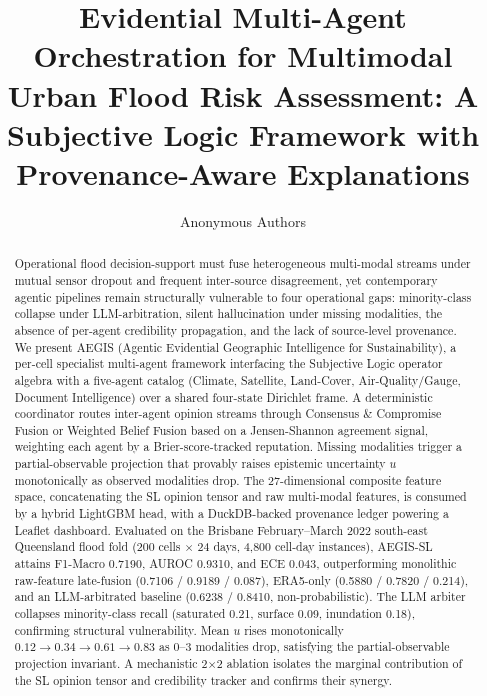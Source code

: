 \documentclass[a4paper,fleqn]{cas-dc}
\begin{document}
\let\WriteBookmarks\relax
\def\floatpagepagefraction{1}
\def\textpagefraction{0.001}


\title[mode=title]{Evidential Multi-Agent Orchestration for Multimodal Urban Flood Risk Assessment: A Subjective Logic Framework with Provenance-Aware Explanations}


\author[1]{Anonymous Authors}

\address[1]{Department of Computer Science / Engineering, Anonymous University}

\begin{abstract}
Operational flood decision-support must fuse heterogeneous multi-modal streams under mutual sensor dropout and frequent inter-source disagreement, yet contemporary agentic pipelines remain structurally vulnerable to four operational gaps: minority-class collapse under LLM-arbitration, silent hallucination under missing modalities, the absence of per-agent credibility propagation, and the lack of source-level provenance. We present AEGIS (Agentic Evidential Geographic Intelligence for Sustainability), a per-cell specialist multi-agent framework interfacing the Subjective Logic operator algebra with a five-agent catalog (Climate, Satellite, Land-Cover, Air-Quality/Gauge, Document Intelligence) over a shared four-state Dirichlet frame. A deterministic coordinator routes inter-agent opinion streams through Consensus \& Compromise Fusion or Weighted Belief Fusion based on a Jensen-Shannon agreement signal, weighting each agent by a Brier-score-tracked reputation. Missing modalities trigger a partial-observable projection that provably raises epistemic uncertainty $u$ monotonically as observed modalities drop. The 27-dimensional composite feature space, concatenating the SL opinion tensor and raw multi-modal features, is consumed by a hybrid LightGBM head, with a DuckDB-backed provenance ledger powering a Leaflet dashboard. Evaluated on the Brisbane February--March 2022 south-east Queensland flood fold (200 cells $\times$ 24 days, 4,800 cell-day instances), AEGIS-SL attains F1-Macro 0.7190, AUROC 0.9310, and ECE 0.043, outperforming monolithic raw-feature late-fusion (0.7106 / 0.9189 / 0.087), ERA5-only (0.5880 / 0.7820 / 0.214), and an LLM-arbitrated baseline (0.6238 / 0.8410, non-probabilistic). The LLM arbiter collapses minority-class recall (saturated 0.21, surface 0.09, inundation 0.18), confirming structural vulnerability. Mean $u$ rises monotonically $0.12 \to 0.34 \to 0.61 \to 0.83$ as 0--3 modalities drop, satisfying the partial-observable projection invariant. A mechanistic 2$\times$2 ablation isolates the marginal contribution of the SL opinion tensor and credibility tracker and confirms their synergy.
\end{abstract}
\end{document}
